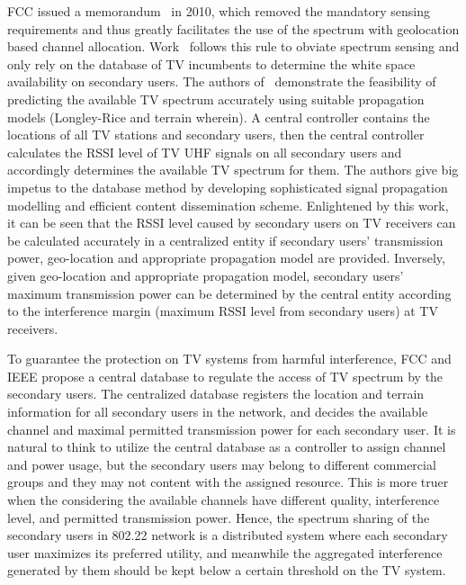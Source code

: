 FCC issued a memorandum~\cite{FCC_2010_sedond_memorandumm,FCCdatabasae} in 2010, which removed the mandatory sensing requirements and thus greatly facilitates the use of the spectrum with geolocation based channel allocation.
Work~\cite{SenseLess2011} follows this rule to obviate spectrum sensing and only rely on the database of TV incumbents to determine the white space availability on secondary users. 
The authors of~\cite{SenseLess2011} demonstrate the feasibility of predicting the available TV spectrum accurately using suitable propagation models (Longley-Rice and terrain wherein). 
A central controller contains the locations of all TV stations and secondary users, then the central controller calculates the RSSI level of TV UHF signals on all secondary users and accordingly determines the available TV spectrum for them. 
The authors give big impetus to the database method by developing sophisticated signal propagation modelling and efficient content dissemination scheme. 
Enlightened by this work, it can be seen that the RSSI level caused by secondary users on TV receivers can be calculated accurately in a centralized entity if secondary users' transmission power, geo-location and appropriate propagation model are provided. 
Inversely, given geo-location and appropriate propagation model, secondary users' maximum transmission power can be determined by the central entity according to the interference margin (maximum RSSI level from secondary users) at TV receivers. 

To guarantee the protection on TV systems from harmful interference, FCC and IEEE propose a central database to regulate the access of TV spectrum by the secondary users.
The centralized database registers the location and terrain information for all secondary users in the network, and decides the available channel and maximal permitted transmission power for each secondary user. 
It is natural to think to utilize the central database as a controller to assign channel and power usage, but the secondary users may belong to different commercial groups and they may not content with the assigned resource.
This is more truer when the considering the available channels have different quality, \ie interference level, and permitted transmission power.
Hence, the spectrum sharing of the secondary users in 802.22 network is a distributed system where each secondary user maximizes its preferred utility, and meanwhile the aggregated interference generated by them should be kept below a certain threshold on the TV system.

